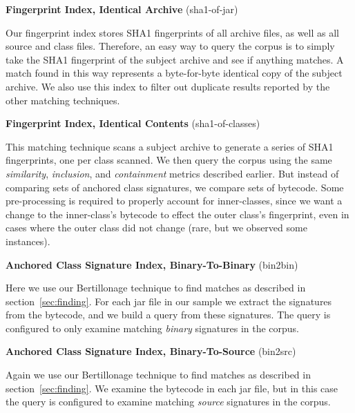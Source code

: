 \begin{description}
    \item \textbf{Fingerprint Index, Identical Archive} (sha1-of-jar)

    Our fingerprint index stores SHA1 fingerprints of all archive files, as
    well as all source and class files.  Therefore, an easy way to query the
    corpus is to simply take the SHA1 fingerprint of the subject archive and
    see if anything matches.   A match found in this way represents a
    byte-for-byte identical copy of the subject archive.  We also use this
    index to filter out duplicate results reported by the other matching
    techniques.

    \vspace{0.7em}
    \item \textbf{Fingerprint Index, Identical Contents} (sha1-of-classes)

    This matching technique scans a subject archive to generate a series of
    SHA1 fingerprints, one per class scanned.  We then query the corpus using
    the same \emph{similarity}, \emph{inclusion}, and \emph{containment}
    metrics described earlier.  But instead of comparing sets of anchored class
    signatures, we compare sets of bytecode.  Some pre-processing is required
    to properly account for inner-classes, since we want a change to the
    inner-class's bytecode to effect the outer class's fingerprint, even in
    cases where the outer class did not change (rare, but we observed some
    instances).

    \vspace{0.7em}
    \item \textbf{Anchored Class Signature Index, Binary-To-Binary} (bin2bin)

    Here we use our Bertillonage technique to find matches as described in
    section~\ref{sec:finding}.  For each jar file in our sample we extract the
    signatures from the bytecode, and we build a query from these signatures.
    The query is configured to only examine matching \emph{binary} signatures in the corpus.


    \vspace{0.7em}
    \item \textbf{Anchored Class Signature Index, Binary-To-Source} (bin2src)

    Again we use our Bertillonage technique to find matches as described in
    section~\ref{sec:finding}.  We examine the bytecode in each jar file, but
    in this case the query is configured to examine matching \emph{source} signatures in
    the corpus.


\end{description}

